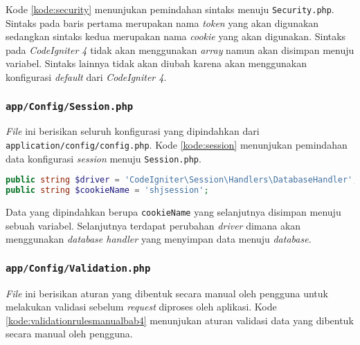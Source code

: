 Kode \ref{kode:security} menunjukan pemindahan sintaks menuju \texttt{Security.php}. Sintaks pada baris pertama merupakan nama \textit{token} yang akan digunakan sedangkan sintaks kedua merupakan nama \textit{cookie} yang akan digunakan. Sintaks pada \textit{CodeIgniter 4} tidak akan menggunakan \textit{array} namun akan disimpan menuju variabel. Sintaks lainnya tidak akan diubah karena akan menggunakan konfigurasi \textit{default} dari \textit{CodeIgniter 4}.

\subsubsection{\texttt{app/Config/Session.php}}
\textit{File} ini berisikan seluruh konfigurasi yang dipindahkan dari \texttt{application/config/config.php}. Kode \ref{kode:session} menunjukan pemindahan data konfigurasi \textit{session} menuju \texttt{Session.php}.
\begin{lstlisting}[language=PHP, caption=Pemindahan \textit{file} \textit{config} menuju \texttt{Session.php}, label=kode:session]
public string $driver = 'CodeIgniter\Session\Handlers\DatabaseHandler';
public string $cookieName = 'shjsession';
\end{lstlisting}

Data yang dipindahkan berupa \texttt{cookieName} yang selanjutnya disimpan menuju sebuah variabel. Selanjutnya terdapat perubahan \textit{driver} dimana akan menggunakan \textit{database handler} yang menyimpan data menuju \textit{database}.

\subsubsection{\texttt{app/Config/Validation.php}}
\label{subsubsec:validationbab4}
\textit{File} ini berisikan aturan yang dibentuk secara manual oleh pengguna untuk melakukan validasi sebelum \textit{request} diproses oleh aplikasi. Kode \ref{kode:validationrulesmanualbab4} menunjukan aturan validasi data yang dibentuk secara manual oleh pengguna.

